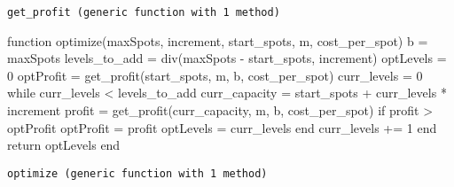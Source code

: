 \documentclass[
  11pt,
]{article}
\newenvironment{Shaded}{\begin{snugshade}}{\end{snugshade}}
\newcommand{\ControlFlowTok}[1]{\textcolor[rgb]{0.00,0.23,0.31}{#1}}
\newcommand{\FloatTok}[1]{\textcolor[rgb]{0.68,0.00,0.00}{#1}}
\newcommand{\FunctionTok}[1]{\textcolor[rgb]{0.28,0.35,0.67}{#1}}
\newcommand{\KeywordTok}[1]{\textcolor[rgb]{0.00,0.23,0.31}{#1}}
\newcommand{\NormalTok}[1]{\textcolor[rgb]{0.00,0.23,0.31}{#1}}
\newcommand{\OperatorTok}[1]{\textcolor[rgb]{0.37,0.37,0.37}{#1}}
\begin{document}
\begin{verbatim}
get_profit (generic function with 1 method)
\end{verbatim}

\begin{Shaded}
\begin{Highlighting}[numbers=left,,]
\KeywordTok{function} \FunctionTok{optimize}\NormalTok{(maxSpots, increment, start\_spots, m, cost\_per\_spot)}
\NormalTok{    b }\OperatorTok{=}\NormalTok{ maxSpots}
\NormalTok{    levels\_to\_add }\OperatorTok{=} \FunctionTok{div}\NormalTok{(maxSpots }\OperatorTok{{-}}\NormalTok{ start\_spots, increment)}
\NormalTok{    optLevels }\OperatorTok{=} \FloatTok{0} 
\NormalTok{    optProfit }\OperatorTok{=} \FunctionTok{get\_profit}\NormalTok{(start\_spots, m, b, cost\_per\_spot)}
\NormalTok{    curr\_levels }\OperatorTok{=} \FloatTok{0}
    \ControlFlowTok{while}\NormalTok{ curr\_levels }\OperatorTok{\textless{}}\NormalTok{ levels\_to\_add}
\NormalTok{        curr\_capacity }\OperatorTok{=}\NormalTok{ start\_spots }\OperatorTok{+}\NormalTok{ curr\_levels }\OperatorTok{*}\NormalTok{ increment}
\NormalTok{        profit }\OperatorTok{=} \FunctionTok{get\_profit}\NormalTok{(curr\_capacity, m, b, cost\_per\_spot)}
        \ControlFlowTok{if}\NormalTok{ profit }\OperatorTok{\textgreater{}}\NormalTok{ optProfit}
\NormalTok{            optProfit }\OperatorTok{=}\NormalTok{ profit}
\NormalTok{            optLevels }\OperatorTok{=}\NormalTok{ curr\_levels}
        \ControlFlowTok{end}
\NormalTok{        curr\_levels }\OperatorTok{+=} \FloatTok{1}
    \ControlFlowTok{end}
    \ControlFlowTok{return}\NormalTok{ optLevels}
\KeywordTok{end}
\end{Highlighting}
\end{Shaded}

\begin{verbatim}
optimize (generic function with 1 method)
\end{verbatim}
\end{document}
